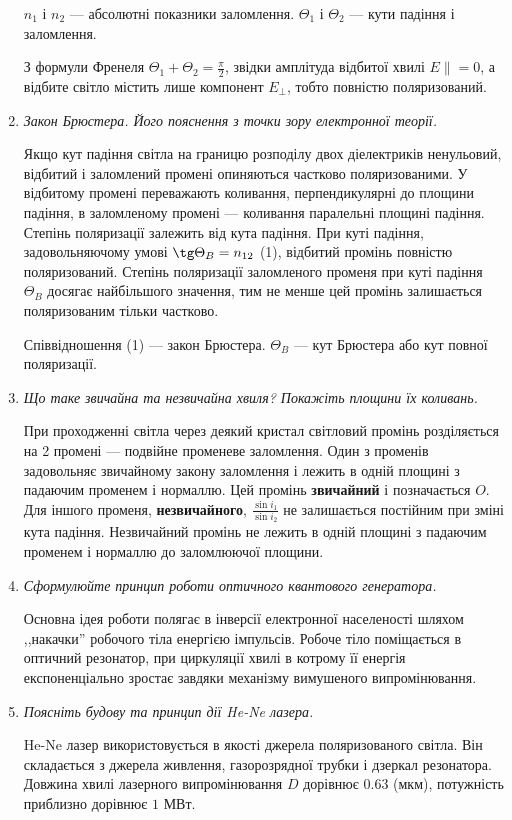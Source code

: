 \documentclass[a4paper,10pt,notitlepage,pdftex,headsepline]{scrartcl}
\begin{document}
\begin{enumerate}
$n_1$ і $n_2$ --- абсолютні показники заломлення.
$\Theta_1$ і $\Theta_2$ --- кути падіння і заломлення.

З формули Френеля $\Theta_1 + \Theta_2 = \frac{\pi}{2}$, звідки амплітуда відбитої хвилі $E\parallel = 0$, а відбите світло містить лише компонент $E_\perp$, тобто повністю поляризований.
\item \textit{Закон Брюстера. Його пояснення з точки зору електронної теорії.}

Якщо кут падіння світла на границю розподілу двох діелектриків ненульовий, відбитий і заломлений промені опиняються частково поляризованими.
У відбитому промені переважають коливання, перпендикулярні до площини падіння, в заломленому промені --- коливання паралельні площині падіння.
Степінь поляризації залежить від кута падіння.
При куті падіння, задовольняючому умові $\tg\Theta_B = n_{12}$ (1), відбитий промінь повністю поляризований.
Степінь поляризації заломленого променя при куті падіння $\Theta_B$ досягає найбільшого значення, тим не менше цей промінь залишається поляризованим тільки частково.

Співвідношення (1) --- закон Брюстера.
$\Theta_B$ --- кут Брюстера або кут повної поляризації.
\item \textit{Що таке звичайна та незвичайна хвиля? Покажіть площини їх коливань.}

При проходженні світла через деякий кристал світловий промінь розділяється на 2 промені --- подвійне променеве заломлення.
Один з променів задовольняє звичайному закону заломлення і лежить в одній площині з падаючим променем і нормаллю.
Цей промінь \textbf{звичайний} і позначається $O$.
Для іншого променя, \textbf{незвичайного}, $\frac{\sin{i_1}}{\sin{i_2}}$ не залишається постійним при зміні кута падіння.
Незвичайний промінь не лежить в одній площині з падаючим променем і нормаллю до заломлюючої площини.
\item \textit{Сформулюйте принцип роботи оптичного квантового генератора.}

Основна ідея роботи полягає в інверсії електронної населеності шляхом ,,накачки'' робочого тіла енергією імпульсів.
Робоче тіло поміщається в оптичний резонатор, при циркуляції хвилі в котрому її енергія експоненціально зростає завдяки механізму вимушеного випромінювання.
\item \textit{Поясніть будову та принцип дії He-Ne лазера.}

He-Ne лазер використовується в якості джерела поляризованого світла.
Він складається з джерела живлення, газорозрядної трубки і дзеркал резонатора.
Довжина хвилі лазерного випромінювання $D$ дорівнює $0.63$ (мкм), потужність приблизно дорівнює $1$ МВт.
\end{enumerate}
\end{document}
